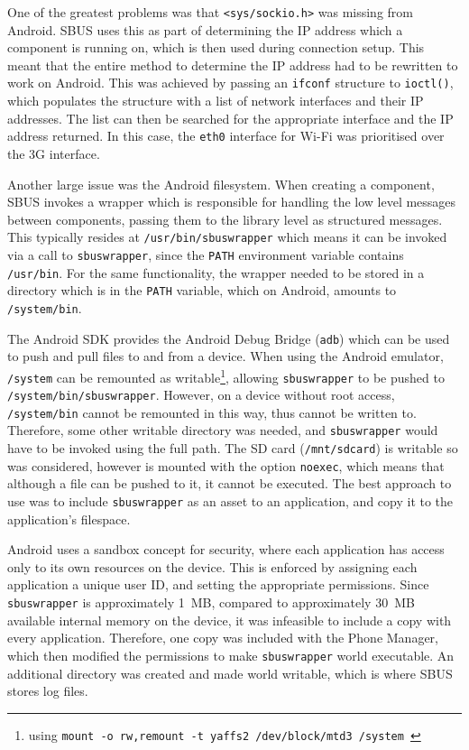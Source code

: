 \documentclass[12pt,twoside,notitlepage]{report}
\begin{document}
One of the greatest problems was that {\tt <sys/sockio.h>} was missing from Android.
SBUS uses this as part of determining the IP address which a component is running on, which is then used during connection setup. 
This meant that the entire method to determine the IP address had to be rewritten to work on Android. 
This was achieved by passing an {\tt ifconf} structure to {\tt ioctl()}, which populates the structure with a list of network interfaces and their IP addresses. 
The list can then be searched for the appropriate interface and the IP address returned. 
In this case, the {\tt eth0} interface for Wi-Fi was prioritised over the 3G interface.

Another large issue was the Android filesystem. 
When creating a component, SBUS invokes a wrapper which is responsible for handling the low level messages between components, passing them to the library level as structured messages.
This typically resides at {\tt /usr/bin/sbuswrapper} which means it can be invoked via a call to {\tt sbuswrapper}, since the {\tt PATH} environment variable contains {\tt /usr/bin}. 
For the same functionality, the wrapper needed to be stored in a directory which is in the {\tt PATH} variable, which on Android, amounts to {\tt /system/bin}. 

The Android SDK provides the Android Debug Bridge ({\tt adb}) which can be used to push and pull files to and from a device. 
When using the Android emulator, {\tt /system} can be remounted as writable\footnote{using {\tt mount -o rw,remount -t yaffs2 /dev/block/mtd3 /system }}, allowing {\tt sbuswrapper} to be pushed to {\tt /system/bin/sbuswrapper}. 
However, on a device without root access, {\tt /system/bin} cannot be remounted in this way, thus cannot be written to. 
Therefore, some other writable directory was needed, and {\tt sbuswrapper} would have to be invoked using the full path. 
The SD card ({\tt /mnt/sdcard}) is writable so was considered, however is mounted with the option {\tt noexec}, which means that although a file can be pushed to it, it cannot be executed. 
The best approach to use was to include {\tt sbuswrapper} as an asset to an application, and copy it to the application's filespace.

Android uses a sandbox concept for security, where each application has access only to its own resources on the device. 
This is enforced by assigning each application a unique user ID, and setting the appropriate permissions. 
Since {\tt sbuswrapper} is approximately \SI{1}{MB}, compared to approximately \SI{30}{MB} available internal memory on the device, it was infeasible to include a copy with every application. 
Therefore, one copy was included with the Phone Manager, which then modified the permissions to make {\tt sbuswrapper} world executable. 
An additional directory was created and made world writable, which is where SBUS stores log files. 
\end{document}

